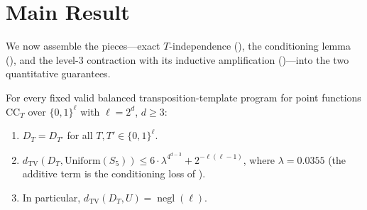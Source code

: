\documentclass[version=final]{iacrcc}
\DeclareMathOperator{\negl}{negl}
\newcommand{\dtv}{d_{\mathrm{TV}}}
\newcommand{\CC}{\mathrm{CC}}
\begin{document}
\section{Main Result}
\label{sec:main}

We now assemble the pieces---exact $T$-independence (), the
conditioning lemma (), and the level-$3$ contraction with
its inductive amplification ()---into the two
quantitative guarantees.

\begin{theorem}
\label{thm:main}
For every fixed valid balanced transposition-template program for point functions
$\CC_T$ over $\{0,1\}^\ell$ with $\ell = 2^d$, $d \geq 3$:
\begin{enumerate}[label=(\alph*),nosep]
\item $D_T = D_{T'}$ for all $T, T' \in \{0,1\}^\ell$.
\item $\dtv(D_T, \mathrm{Uniform}(S_5)) \leq 6 \cdot \lambda^{4^{d-3}} + 2^{-\ell(\ell-1)}$,
  where $\lambda = 0.0355$ (the additive term is the conditioning loss of
  ).
\item In particular, $\dtv(D_T, U) = \negl(\ell)$.
\end{enumerate}
\end{theorem}
\end{document}

